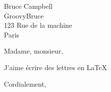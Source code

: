 \documentclass[%
french,
10pt,
a4paper]
{akletter}
\begin{document}
\begin{letter}{Bruce Campbell \\ GroovyBruce \\ 
		123 Rue de la machine \\ Paris}
\renewcommand*\pnumfont   {\bfseries}
\renewcommand*\headfont   {\slshape} 
\renewcommand*\reffont    {\normalfont}
\renewcommand*\reftextfont{\normalfont}
\pagestyle{headings} %
 \signature{\vspace{-1cm} Sovannara HAK}
\subject{Mon sujet}
\opening{Madame, monsieur,}
J'aime écrire des lettres en \LaTeX

\closing{Cordialement,}


\end{letter}

\end{document}
